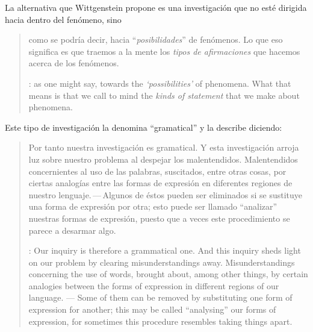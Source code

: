 La alternativa que Wittgenstein propone es una investigación que no esté dirigida hacia dentro del fenómeno, sino \blockquote[{\cite[\S90]{wittgenstein1953phiinv}}: as one might say, towards the \emph{`possibilities'} of phenomena. What that means is that we call to mind the \emph{kinds of statement} that we make about phenomena.]{como se podría decir, hacia \enquote{\emph{posibilidades}} de fenómenos. Lo que eso significa es que traemos a la mente los \emph{tipos de afirmaciones} que hacemos acerca de los fenómenos.} Este tipo de investigación la denomina \enquote{gramatical} y la describe diciendo: \blockquote[{\cite[\S90]{wittgenstein1953phiinv}}: Our inquiry is therefore a grammatical one. And this inquiry sheds light on our problem by clearing misunderstandings away. Misunderstandings concerning the use of words, brought about, among other things, by certain analogies between the forms of expression in different regions of our language. --- Some of them can be removed by substituting one form of expression for another; this may be called \enquote{analysing} our forms of expression, for sometimes this procedure resembles taking things apart.]{Por tanto nuestra investigación es gramatical. Y esta investigación arroja luz sobre nuestro problema al despejar los malentendidos. Malentendidos concernientes al uso de las palabras, suscitados, entre otras cosas, por ciertas analogías entre las formas de expresión en diferentes regiones de nuestro lenguaje.\,---\,Algunos de éstos pueden ser eliminados si se sustituye una forma de expresión por otra; esto puede ser llamado \enquote{analizar} nuestras formas de expresión, puesto que a veces este procedimiento se parece a desarmar algo.}

